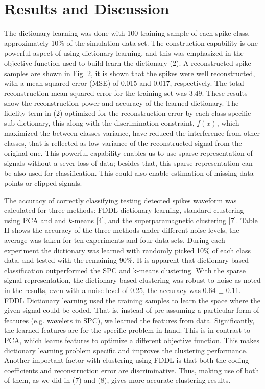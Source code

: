 \documentclass[conference]{IEEEtran}
\begin{document}
 	\section{Results and Discussion}
	The dictionary learning was done with 100 training sample of each spike class, approximately 10\% of the simulation data set. The construction capability is one powerful aspect of using dictionary learning, and this was emphasized in the objective function used to build learn the dictionary (2). A reconstructed spike samples are shown in Fig. 2, it is shown that the spikes were well reconstructed, with a mean squared error (MSE) of 0.015 and 0.017, respectively. The total reconstruction mean squared error for the training set was 3.49. These results show the reconstruction power and accuracy of the learned dictionary. The fidelity term in (2) optimized for the reconstruction error by each class specific sub-dictionary, this along with the discrimination constraint, $f(x)$, which maximized the between classes variance, have reduced the interference from other classes, that is reflected as low variance of the reconstructed signal from the original one. This powerful capability enables us to use sparse representation of signals without a sever loss of data; besides that, this sparse representation can be also used for classification. This could also enable estimation of missing data points or clipped signals.
	
	The accuracy of correctly classifying testing detected spikes waveform was calculated for three methods: FDDL dictionary learning, standard clustering using PCA and and $k$-means [4], and the superparamagnetic clustering [7]. Table II shows the accuracy of the three methods under different noise levels, the average was taken for ten experiments and four
	data sets. During each experiment the dictionary was learned with randomly picked 10\% of each class data, and tested with the remaining 90\%. It is apparent that dictionary based classification outperformed the SPC and k-means clustering. With the sparse signal representation, the dictionary based clustering was robust to noise as noted in the results, even with a noise level of 0.25, the accuracy was 0.64 $\pm$ 0.11. FDDL Dictionary learning used the training samples to learn the space where the given signal could be coded. That is, instead of pre-assuming a particular form of features (e.g. wavelets in SPC), we learned the features from data. Significantly, the learned features are for the specific problem in hand. This is in contrast to PCA, which learns features to optimize a different objective function. This makes dictionary learning problem specific and improves the clustering performance. Another important factor with clustering using FDDL is that both the coding coefficients and reconstruction error are discriminative. Thus, making use of both of them, as we did in (7) and (8), gives more accurate clustering results.
	
\end{document}
